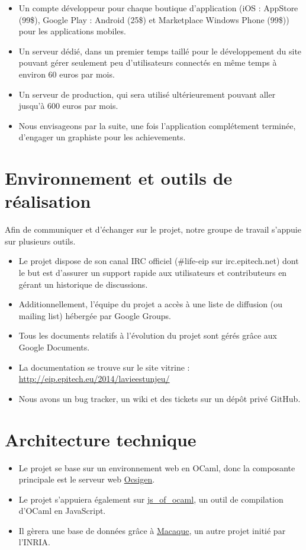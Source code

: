\documentclass{life-fr}
\begin{document}
\begin{itemize}
  \item Un compte développeur pour chaque boutique d'application (iOS : AppStore (99\$), Google Play : Android (25\$) et Marketplace Windows Phone (99\$)) pour les applications mobiles.
  \item Un serveur dédié, dans un premier temps taillé pour le développement du site pouvant gérer seulement peu d'utilisateurs connectés en même temps à environ 60 euros par mois.
  \item Un serveur de production, qui sera utilisé ultérieurement pouvant aller jusqu'à 600 euros par mois.
  \item Nous envisageons par la suite, une fois l'application complétement terminée, d'engager un graphiste pour les achievements.
\end{itemize}

\section{Environnement et outils de réalisation}

Afin de communiquer et d’échanger sur le projet, notre groupe de travail s’appuie sur plusieurs outils.

\begin{itemize}
  \item Le projet dispose de son canal IRC officiel (\#life-eip sur irc.epitech.net) dont le but est d’assurer un support rapide aux utilisateurs et contributeurs en gérant un historique de discussions.
  \item Additionnellement, l’équipe du projet a accès à une liste de diffusion (ou mailing list) hébergée par Google Groups.
  \item Tous les documents relatifs à l’évolution du projet sont gérés grâce aux Google Documents.
  \item La documentation se trouve sur le site vitrine : \url{http://eip.epitech.eu/2014/lavieestunjeu/}
  \item Nous avons un bug tracker, un wiki et des tickets sur un dépôt privé GitHub.
\end{itemize}

\section{Architecture technique}

\begin{itemize}
  \item Le projet se base sur un environnement web en OCaml, donc la composante principale est le serveur web \href{http://ocsigen.org/}{Ocsigen}.
  \item Le projet s’appuiera également sur \href{http://ocsigen.org/js\_of\_ocaml/}{js\_of\_ocaml}, un outil de compilation d’OCaml en JavaScript.
  \item Il gèrera une base de données grâce à \href{http://ocsigen.org/macaque/}{Macaque}, un autre projet initié par l’INRIA.
\end{itemize}
\end{document}
